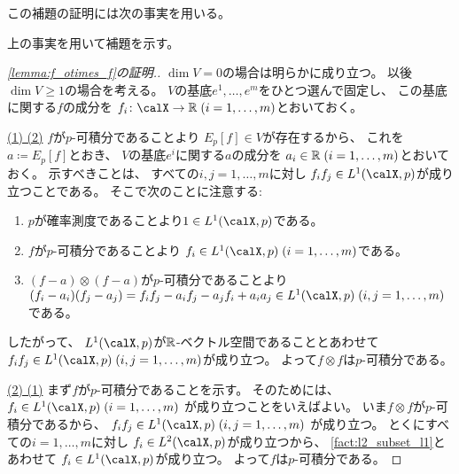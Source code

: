\documentclass[report]{jlreq}
\begin{document}
この補題の証明には次の事実を用いる。


上の事実を用いて補題を示す。

\begin{proof}[\cref{lemma:f_otimes_f}の証明.]
    $\dim V = 0$の場合は明らかに成り立つ。
    以後$\dim V \ge 1$の場合を考える。
    $V$の基底$e^1, \dots, e^m$をひとつ選んで固定し、
    この基底に関する$f$の成分を
    $f_i \colon \calX \to \R \; (i = 1, \dots, m)$とおいておく。

    \uline{(1) \Rightarrow (2)} \quad
    $f$が$p$-可積分であることより
    $E_p[f] \in V$が存在するから、
    これを$a \coloneqq E_p[f]$とおき、
    $V$の基底$e^i$に関する$a$の成分を
    $a_i \in \mathbb{R} \; (i = 1, \dots, m)$とおいておく。
    示すべきことは、
    すべての$i, j = 1, \dots, m$に対し
    $f_i f_j \in L^1(\calX, p)$が成り立つことである。
    そこで次のことに注意する:
    \begin{enumerate}[label=(\roman*)]
        \item $p$が確率測度であることより$1 \in L^1(\calX, p)$である。
        \item $f$が$p$-可積分であることより
            $f_i \in L^1(\calX, p) \; (i = 1, \dots, m)$である。
        \item $(f - a) \otimes (f - a)$が$p$-可積分であることより
            $(f_i - a_i)(f_j - a_j)
                = f_i f_j - a_i f_j - a_j f_i + a_i a_j \in L^1(\calX, p) \;
                (i, j = 1, \dots, m)$である。
    \end{enumerate}
    したがって、
    $L^1(\calX, p)$が$\mathbb{R}$-ベクトル空間であることとあわせて
    $f_i f_j \in L^1(\calX, p) \; (i, j = 1, \dots, m)$が成り立つ。
    よって$f \otimes f$は$p$-可積分である。

    \uline{(2) \Rightarrow (1)} \quad
    まず$f$が$p$-可積分であることを示す。
    そのためには、
    $f_i \in L^1(\calX, p) \; (i = 1, \dots, m)$
    が成り立つことをいえばよい。
    いま$f \otimes f$が$p$-可積分であるから、
    $f_i f_j \in L^1(\calX, p) \; (i, j = 1, \dots, m)$
    が成り立つ。
    とくにすべての$i = 1, \dots, m$に対し
    $f_i \in L^2(\calX, p)$が成り立つから、
    \cref{fact:l2_subset_l1}とあわせて
    $f_i \in L^1(\calX, p)$が成り立つ。
    よって$f$は$p$-可積分である。


\end{proof}
\end{document}
